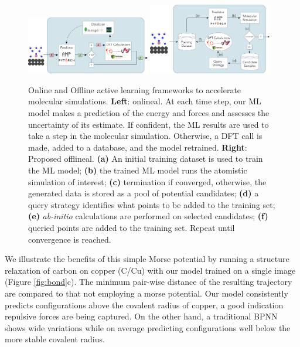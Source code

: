 \documentclass[
 reprint,
 amsmath,
 amssymb,
 aps,
]{revtex4-1}
\begin{document}
\begin{figure}[ht!]
    \centering
    \includegraphics[width=0.48\textwidth]{figures/figure_2a.pdf}
    \includegraphics[width=0.48\textwidth]{figures/figure_2b.pdf}
    \caption{Online and Offline active learning frameworks to accelerate molecular simulations.
    \textbf{Left}: \gls{onlineal}. At each time step, our ML model makes a prediction of the energy and forces and assesses the uncertainty of its estimate. If confident, the ML results are used to take a step in the molecular simulation. Otherwise, a DFT call is made, added to a database, and the model retrained. \textbf{Right}: Proposed \gls{offlineal}.
    \textbf{(a)} An initial training dataset is used to train the ML model; \textbf{(b)} the trained ML model runs the atomistic simulation of interest; \textbf{(c)} termination if converged, otherwise, the generated data is stored as a pool of potential candidates; \textbf{(d)} a query strategy identifies what points to be added to the training set; \textbf{(e)} \textit{ab-initio} calculations are performed on selected candidates; \textbf{(f)} queried points are added to the training set. Repeat until convergence is reached.}
    \label{fig:framework}
\end{figure}

We illustrate the benefits of this simple Morse potential by running a structure relaxation of carbon on copper (C/Cu) with our model trained on a single image (Figure \ref{fig:bond}c). The minimum pair-wise distance of the resulting trajectory are compared to that not employing a morse potential. Our model consistently predicts configurations above the covalent radius of copper, a good indication repulsive forces are being captured. On the other hand, a traditional BPNN shows wide variations while on average predicting configurations well below the more stable covalent radius.
\end{document}
